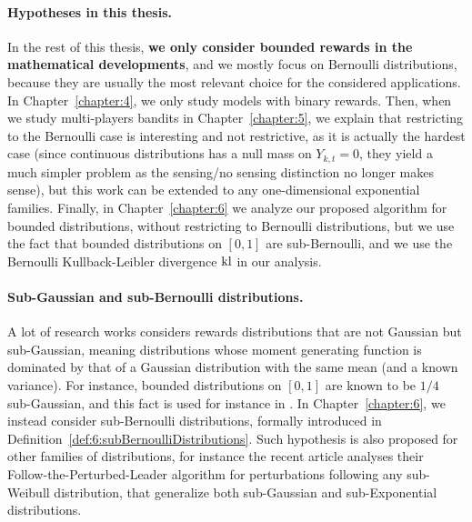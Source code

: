 \paragraph{Hypotheses in this thesis.}
%
In the rest of this thesis, \textbf{we only consider bounded rewards in the mathematical developments}, and we mostly focus on Bernoulli distributions, because they are usually the most relevant choice for the considered applications.
In Chapter~\ref{chapter:4}, we only study models with binary rewards.
%
Then, when we study multi-players bandits in Chapter~\ref{chapter:5}, we explain that restricting to the Bernoulli case is interesting and not restrictive, as it is actually the hardest case (since continuous distributions has a null mass on $Y_{k,t}=0$, they yield a much simpler problem as the sensing/no sensing distinction no longer makes sense), but this work can be extended to any one-dimensional exponential families.
%
Finally, in Chapter~\ref{chapter:6} we analyze our proposed algorithm for bounded distributions, without restricting to Bernoulli distributions, but we use the fact that bounded distributions on $[0,1]$ are sub-Bernoulli, and we use the Bernoulli Kullback-Leibler divergence $\mathrm{kl}$ in our analysis.


\paragraph{Sub-Gaussian and sub-Bernoulli distributions.}
%
A lot of research works considers rewards distributions that are not Gaussian but sub-Gaussian,
meaning distributions whose moment generating function is dominated by that of a Gaussian distribution with the same mean (and a known variance).
For instance, bounded distributions on $[0,1]$ are known to be $1/4$ sub-Gaussian, and this fact is used for instance in \cite{Maillard2018GLR}.
In Chapter~\ref{chapter:6}, we instead consider sub-Bernoulli distributions, formally introduced in Definition~\ref{def:6:subBernoulliDistributions}.
%
Such hypothesis is also proposed for other families of distributions, for instance the recent article \cite{KimTewari2019} analyses their Follow-the-Perturbed-Leader algorithm for perturbations following any sub-Weibull distribution, that generalize both sub-Gaussian and sub-Exponential distributions.



